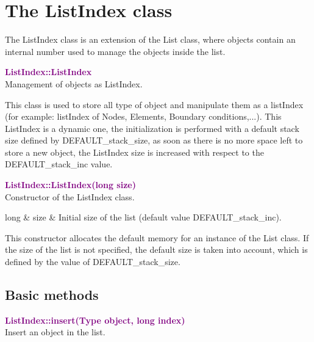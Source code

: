 \section{The ListIndex class}

The ListIndex class is an extension of the List class, where objects contain an internal number used to manage the objects inside the list.

\textcolor{purple}{\textbf{ListIndex::ListIndex}}\label{ListIndex::ListIndex}\\
Management of objects as ListIndex.

This class is used to store all type of object and manipulate them as a listIndex (for example: listIndex of Nodes, Elements, Boundary conditions,...).
This ListIndex is a dynamic one, the initialization is performed with a default stack size defined by DEFAULT\_stack\_size, as soon as there is no more space left to store a new object,
the ListIndex size is increased with respect to the DEFAULT\_stack\_inc value.



\textcolor{purple}{\textbf{ListIndex::ListIndex(long size)}}\label{ListIndex::ListIndex(long size)}\\
Constructor of the ListIndex class.

\begin{tcolorbox}[width=\textwidth,myArgs,tabularx={ll|R}]
long & size & Initial size of the list (default value DEFAULT\_stack\_inc).
\end{tcolorbox}

This constructor allocates the default memory for an instance of the List class.
If the size of the list is not specified, the default size is taken into account, which is defined by the value of DEFAULT\_stack\_size.

\subsection{Basic methods}

\textcolor{purple}{\textbf{ListIndex::insert(Type object, long index)}}\label{ListIndex::insert(Type object, long index)}\\
Insert an object in the list.

